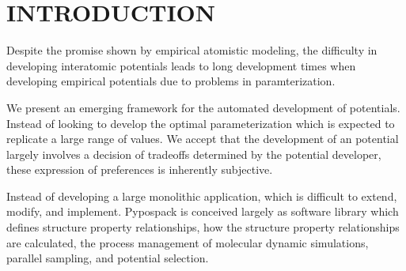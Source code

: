 \chapter{INTRODUCTION}
\label{intro}

Despite the promise shown by empirical atomistic modeling, the difficulty in developing interatomic potentials leads to long development times when developing empirical potentials due to problems in paramterization.

We present an emerging framework for the automated development of potentials.  Instead of looking to develop the optimal parameterization which is expected to replicate a large range of values.  We accept that the development of an potential largely involves a decision of tradeoffs determined by the potential developer, these expression of preferences is inherently subjective.

Instead of developing a large monolithic application, which is difficult to extend, modify, and implement.  Pypospack is conceived largely as software library which defines structure property relationships, how the structure property relationships are calculated, the process management of molecular dynamic simulations, parallel sampling, and potential selection.
